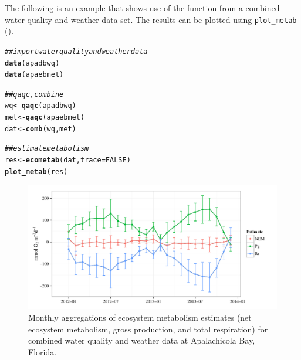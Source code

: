 \documentclass[10pt,letterpaper]{article}\usepackage[]{graphicx}\usepackage[]{color}
\makeatletter
\def\maxwidth{ %
  \ifdim\Gin@nat@width>\linewidth
    \linewidth
  \else
    \Gin@nat@width
  \fi
}
\newcommand{\hlnum}[1]{\textcolor[rgb]{0.686,0.059,0.569}{#1}}%
\newcommand{\hlcom}[1]{\textcolor[rgb]{0.678,0.584,0.686}{\textit{#1}}}%
\newcommand{\hlstd}[1]{\textcolor[rgb]{0.345,0.345,0.345}{#1}}%
\newcommand{\hlkwb}[1]{\textcolor[rgb]{0.69,0.353,0.396}{#1}}%
\newcommand{\hlkwc}[1]{\textcolor[rgb]{0.333,0.667,0.333}{#1}}%
\newcommand{\hlkwd}[1]{\textcolor[rgb]{0.737,0.353,0.396}{\textbf{#1}}}%
\newenvironment{kframe}{%
 \def\at@end@of@kframe{}%
 \ifinner\ifhmode%
  \def\at@end@of@kframe{\end{minipage}}%
  \begin{minipage}{\columnwidth}%
 \fi\fi%
 \def\FrameCommand##1{\hskip\@totalleftmargin \hskip-\fboxsep
 \colorbox{shadecolor}{##1}\hskip-\fboxsep
     \hskip-\linewidth \hskip-\@totalleftmargin \hskip\columnwidth}%
 \MakeFramed {\advance\hsize-\width
   \@totalleftmargin\z@ \linewidth\hsize
   \@setminipage}}%
 {\par\unskip\endMakeFramed%
 \at@end@of@kframe}
\newenvironment{knitrout}{}{} %
\makeatother
\begin{document}
The following is an example that shows use of the function from a combined water quality and weather data set.  The results can be plotted using \texttt{plot\_metab} ().

\begin{knitrout}
\color{fgcolor}\begin{kframe}
\begin{alltt}
\hlcom{## import water quality and weather data}
\hlkwd{data}\hlstd{(apadbwq)}
\hlkwd{data}\hlstd{(apaebmet)}

\hlcom{## qaqc, combine}
\hlstd{wq} \hlkwb{<-} \hlkwd{qaqc}\hlstd{(apadbwq)}
\hlstd{met} \hlkwb{<-} \hlkwd{qaqc}\hlstd{(apaebmet)}
\hlstd{dat} \hlkwb{<-} \hlkwd{comb}\hlstd{(wq, met)}

\hlcom{## estimate metabolism}
\hlstd{res} \hlkwb{<-} \hlkwd{ecometab}\hlstd{(dat,} \hlkwc{trace} \hlstd{=} \hlnum{FALSE}\hlstd{)}
\hlkwd{plot_metab}\hlstd{(res)}
\end{alltt}
\end{kframe}\begin{figure}[!ht]


{\centering \includegraphics[width=\maxwidth]{figure/metab_ex} 

}

\caption[Monthly aggregations of ecosystem metabolism estimates (net ecosystem metabolism, gross production, and total respiration) for combined water quality and weather data at Apalachicola Bay, Florida]{Monthly aggregations of ecosystem metabolism estimates (net ecosystem metabolism, gross production, and total respiration) for combined water quality and weather data at Apalachicola Bay, Florida.\label{fig:metab_ex}}
\end{figure}


\end{knitrout}
\end{document}
